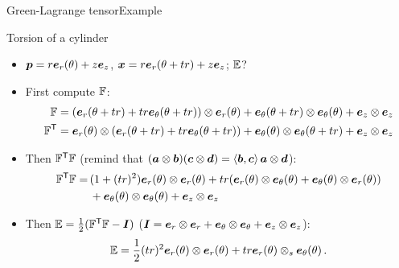 \begin{frame}{Green-Lagrange tensor}{Example}
\begin{overprint}
\vskip-20pt
\begin{block}{Torsion of a cylinder}
\begin{itemize}
\item $\pv=r\ev_r(\theta)+z\ev_z$, $\xv=r\ev_r(\theta+tr)+z\ev_z$; $\GreenL$?
\item First compute $\Fp$:
{\scriptsize
\begin{displaymath}
\begin{split}
\Fp&=(\ev_r(\theta+tr)+tr\ev_\theta(\theta+tr))\otimes\ev_r(\theta)+\ev_\theta(\theta+tr)\otimes\ev_\theta(\theta)+\ev_z\otimes\ev_z \\
\Fp^\itr &=\ev_r(\theta)\otimes(\ev_r(\theta+tr)+tr\ev_\theta(\theta+tr))+\ev_\theta(\theta)\otimes\ev_\theta(\theta+tr)+\ev_z\otimes\ev_z
\end{split}
\end{displaymath}}
\item Then $\Fp^\itr\Fp$ (remind that $(\av\otimes\bv)(\cv\otimes\dv)=\scal{\bv,\cv}\av\otimes\dv$):
{\scriptsize
\begin{displaymath}
\begin{split}
\Fp^\itr\Fp= &\,(1+(tr)^2)\ev_r(\theta)\otimes\ev_r(\theta)+tr(\ev_r(\theta)\otimes\ev_\theta(\theta)+\ev_\theta(\theta)\otimes\ev_r(\theta)) \\
&\,+\ev_\theta(\theta)\otimes\ev_\theta(\theta)+\ev_z\otimes\ev_z
\end{split}
\end{displaymath}}
\item Then $\GreenL=\demi(\Fp^\itr\Fp-\Id)$ ($\Id=\ev_r\otimes\ev_r+\ev_\theta\otimes\ev_\theta+\ev_z\otimes\ev_z$):
{\scriptsize
\begin{displaymath}
\GreenL =\demi(tr)^2\ev_r(\theta)\otimes\ev_r(\theta)+tr\ev_r(\theta)\otimes_s\ev_\theta(\theta)\,.
\end{displaymath}}
\end{itemize}
\end{block}

\end{overprint}

\end{frame}